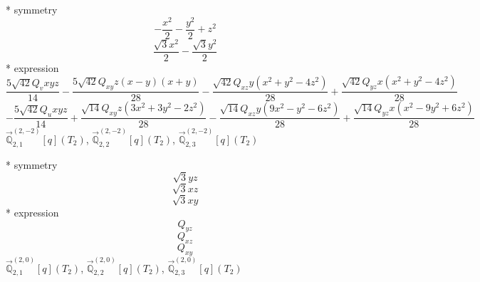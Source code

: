 \documentclass[fleqn,8pt]{jsarticle}
\begin{document}
\noindent\quad ** symmetry
\begin{dmath*}
- \frac{x^{2}}{2} - \frac{y^{2}}{2} + z^{2}
\end{dmath*}
\begin{dmath*}
\frac{\sqrt{3} x^{2}}{2} - \frac{\sqrt{3} y^{2}}{2}
\end{dmath*}
\noindent\quad ** expression
\begin{dmath*}
\frac{5 \sqrt{42} Q_{v} x y z}{14} - \frac{5 \sqrt{42} Q_{xy} z \left(x - y\right) \left(x + y\right)}{28} - \frac{\sqrt{42} Q_{xz} y \left(x^{2} + y^{2} - 4 z^{2}\right)}{28} + \frac{\sqrt{42} Q_{yz} x \left(x^{2} + y^{2} - 4 z^{2}\right)}{28}
\end{dmath*}
\begin{dmath*}
- \frac{5 \sqrt{42} Q_{u} x y z}{14} + \frac{\sqrt{14} Q_{xy} z \left(3 x^{2} + 3 y^{2} - 2 z^{2}\right)}{28} - \frac{\sqrt{14} Q_{xz} y \left(9 x^{2} - y^{2} - 6 z^{2}\right)}{28} + \frac{\sqrt{14} Q_{yz} x \left(x^{2} - 9 y^{2} + 6 z^{2}\right)}{28}
\end{dmath*}
\noindent\quad $\vec{\mathbb{Q}}_{2,1}^{(2,-2)}[q](T_{2})$, $\vec{\mathbb{Q}}_{2,2}^{(2,-2)}[q](T_{2})$, $\vec{\mathbb{Q}}_{2,3}^{(2,-2)}[q](T_{2})$

\noindent\quad ** symmetry
\begin{dmath*}
\sqrt{3} y z
\end{dmath*}
\begin{dmath*}
\sqrt{3} x z
\end{dmath*}
\begin{dmath*}
\sqrt{3} x y
\end{dmath*}
\noindent\quad ** expression
\begin{dmath*}
Q_{yz}
\end{dmath*}
\begin{dmath*}
Q_{xz}
\end{dmath*}
\begin{dmath*}
Q_{xy}
\end{dmath*}
\noindent\quad $\vec{\mathbb{Q}}_{2,1}^{(2,0)}[q](T_{2})$, $\vec{\mathbb{Q}}_{2,2}^{(2,0)}[q](T_{2})$, $\vec{\mathbb{Q}}_{2,3}^{(2,0)}[q](T_{2})$
\end{document}

